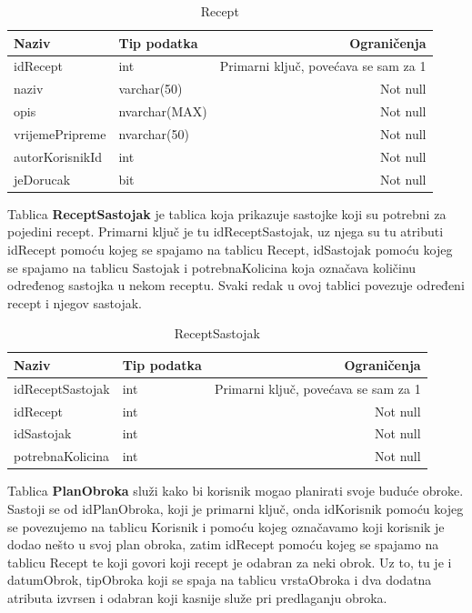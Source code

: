 \documentclass[diplomskirad]{fer}
\begin{document}
\begin{table}[H]
\label{tbl:Recept}
\centering
\renewcommand{\arraystretch}{1.3}
\begin{tabular}{llr} \hline
Naziv & Tip podatka & Ograničenja\\ \hline
idRecept & int & Primarni ključ, povećava se sam za 1 \\
naziv & varchar(50) & Not null\\
opis & nvarchar(MAX) & Not null\\
vrijemePripreme & nvarchar(50) & Not null\\
autorKorisnikId & int & Not null\\
jeDorucak & bit & Not null \\
\end{tabular}
\caption{Recept}
\end{table}

Tablica \textbf{ReceptSastojak} je tablica koja prikazuje sastojke koji su potrebni za pojedini recept. Primarni ključ je tu idReceptSastojak, uz njega su tu atributi idRecept pomoću kojeg se spajamo na tablicu Recept, idSastojak pomoću kojeg se spajamo na tablicu Sastojak i potrebnaKolicina koja označava količinu određenog sastojka u nekom receptu. Svaki redak u ovoj tablici povezuje određeni recept i njegov sastojak.

\begin{table}[H]
\label{tbl:ReceptSastojak}
\centering
\renewcommand{\arraystretch}{1.3}
\begin{tabular}{llr} \hline
Naziv & Tip podatka & Ograničenja\\ \hline
idReceptSastojak & int & Primarni ključ, povećava se sam za 1 \\
idRecept & int & Not null\\
idSastojak & int & Not null\\
potrebnaKolicina & int & Not null\\
\end{tabular}
\caption{ReceptSastojak}
\end{table}

Tablica \textbf{PlanObroka} služi kako bi korisnik mogao planirati svoje buduće obroke. Sastoji se od idPlanObroka, koji je primarni ključ, onda idKorisnik pomoću kojeg se povezujemo na tablicu Korisnik i pomoću kojeg označavamo koji korisnik je dodao nešto u svoj plan obroka, zatim idRecept pomoću kojeg se spajamo na tablicu Recept te koji govori koji recept je odabran za neki obrok. Uz to, tu je i datumObrok, tipObroka koji se spaja na tablicu vrstaObroka i dva dodatna atributa izvrsen i odabran koji kasnije služe pri predlaganju obroka. 
\end{document}
